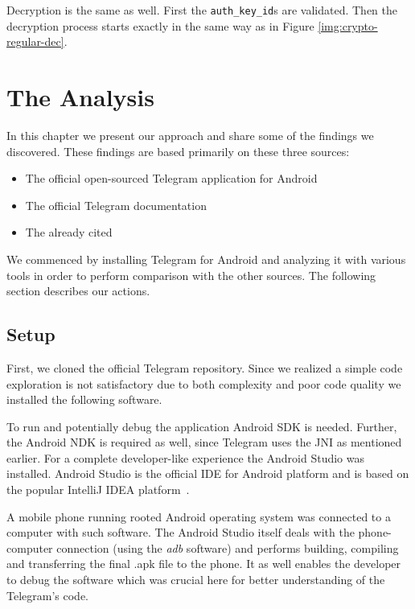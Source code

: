 \documentclass[thesis=M,english]{FITthesis}[2012/10/20]
\begin{document}
Decryption is the same as well. First the \texttt{auth\_key\_id}s are validated.  Then the decryption process starts exactly in the same way as in Figure \ref{img:crypto-regular-dec}.





\chapter{The Analysis}\label{analysis}

In this chapter we present our approach and share some of the findings we discovered. These findings are based primarily on these three sources:

\begin{itemize}
	\item The official open-sourced Telegram application for Android
	\item The official Telegram documentation
	\item The already cited~\cite{telegram-aarhus}
\end{itemize}

We commenced by installing Telegram for Android and analyzing it with various tools in order to perform comparison with the other sources. The following section describes our actions.

\section{Setup}\label{analysis-setup}

First, we cloned the official Telegram repository. Since we realized a simple code exploration is not satisfactory due to both complexity and poor code quality we installed the following software.

To run and potentially debug the application Android SDK is needed. Further, the Android NDK is required as well, since Telegram uses the JNI as mentioned earlier. For a complete developer-like experience the Android Studio was installed. Android Studio is the official IDE for Android platform and is based on the popular IntelliJ IDEA platform~\cite{android-studio}.

A mobile phone running rooted Android operating system was connected to a computer with such software. The Android Studio itself deals with the phone-computer connection (using the \emph{adb} software) and performs building, compiling and transferring the final .apk file to the phone. It as well enables the developer to debug the software which was crucial here for better understanding of the Telegram's code.
\end{document}
